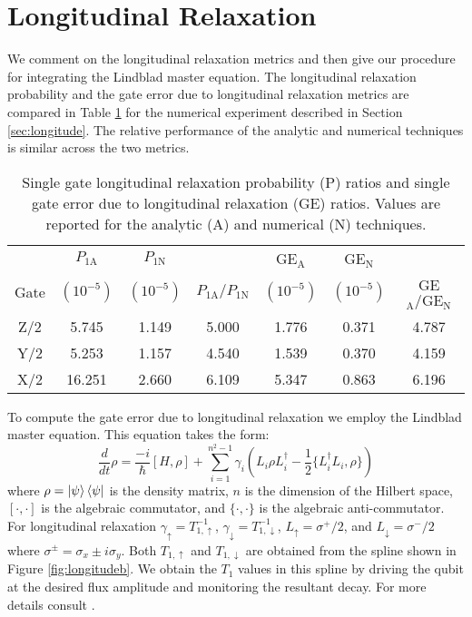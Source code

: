 \section{Longitudinal Relaxation \label{appendix:longitude}}
We comment on the longitudinal relaxation metrics and then give
our procedure for integrating the Lindblad master equation.
The longitudinal relaxation probability and the gate error due to longitudinal
relaxation metrics are compared in Table \ref{tab:longitude} for the
numerical experiment described in Section \ref{sec:longitude}.
The relative performance of the analytic and numerical techniques
is similar across the two metrics.

\begin{table}[h!]
  \begin{tabular}{c | c | c | c | c | c | c}
         & $P_{1\textrm{A}}$ & $P_{1\textrm{N}}$ & & GE$_{\textrm{A}}$ & GE$_{\textrm{N}}$ &\\
    Gate & $(10^{-5})$ & $(10^{-5})$ & $P_{1\textrm{A}}/ P_{1\textrm{N}}$ & $(10^{-5})$ &
    $(10^{-5})$ & GE$_{\textrm{A}} / \textrm{GE}_{\textrm{N}}$\\
    \hline
    Z/2 & 5.745 & 1.149 & 5.000 & 1.776 & 0.371 & 4.787\\
    Y/2 & 5.253 & 1.157 & 4.540 & 1.539 & 0.370 & 4.159\\
    X/2 & 16.251 & 2.660 & 6.109 & 5.347 & 0.863 & 6.196\\
  \end{tabular}
  \caption{
    Single gate longitudinal relaxation probability (P) ratios
    and single gate error due to longitudinal relaxation (GE) ratios.
    Values are reported for the analytic (A) and numerical (N) techniques.
  }
  \label{tab:longitude}
\end{table}

To compute the gate error due to longitudinal relaxation
we employ the Lindblad master equation. This equation takes the form:
\begin{equation}
  \frac{d}{dt} \rho = \frac{-i}{\hbar} [H, \rho]
  + \sum_{i = 1}^{n^{2} - 1} \gamma_{i} (L_{i} \rho L_{i}^{\dagger}
  - \frac{1}{2} \{L_{i}^{\dagger} L_{i}, \rho\})
\end{equation}
where $\rho = \ket{\psi}\bra{\psi}$ is the density matrix, $n$ is the
dimension of the Hilbert space,
$[\cdot, \cdot]$ is the algebraic commutator, and $\{\cdot, \cdot \}$ is the algebraic
anti-commutator.
For longitudinal relaxation $\gamma_{\uparrow} = T_{1, \uparrow}^{-1}$,
$\gamma_{\downarrow} = T_{1, \downarrow}^{-1}$,
$L_{\uparrow} = \sigma^{+}/2$, and
$L_{\downarrow} = \sigma^{-}/2$ where $\sigma^{\pm} = \sigma_{x} \pm i \sigma_{y}$.
Both $T_{1, \uparrow}$ and $T_{1, \downarrow}$ are obtained from the spline
shown in Figure \ref{fig:longitudeb}.
We obtain the $T_{1}$ values in this spline
by driving the qubit at the desired flux amplitude
and monitoring the resultant decay.
For more details consult \cite{zhang2020universal}.

